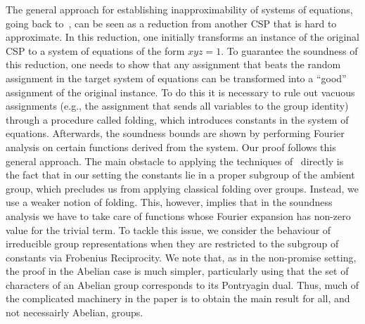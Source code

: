 \documentclass[a4paper,11pt]{article}
\theoremstyle{definition}
\begin{document}
The general approach for establishing inapproximability of systems of equations,
going back to~\cite{Hastad01:jacm,EHR04:tcs}, can be seen as a reduction from another CSP that is hard to approximate. In this reduction, one initially
transforms an instance of the original CSP to a system of equations of the
form $xyz=1$. To guarantee the soundness of this reduction, one needs to show that any
assignment that beats the random assignment in the target system of
equations can be transformed into a ``good'' assignment of the original
instance. To do this it is necessary to rule out vacuous assignments (e.g., the
assignment that sends all variables to the group identity) through a procedure
called folding, which introduces 
constants in the system of equations.
Afterwards, the soundness bounds are shown by performing Fourier analysis on
certain functions derived from the system.
Our proof follows this general approach. The main obstacle to
applying the techniques of~\cite{EHR04:tcs} directly is the fact that in our setting 
the constants lie in a proper subgroup of the
ambient group, which precludes us from applying classical folding over groups. Instead, we use a weaker notion of folding. This, however, implies that in the soundness analysis we have to take care of functions whose Fourier
expansion has non-zero value for the trivial term. To tackle this
issue, we consider the behaviour of irreducible group representations when they are
restricted to the subgroup of constants
via Frobenius Reciprocity.
We note that, as in the non-promise setting, the proof in the Abelian case is
much simpler, particularly using that the set of characters of an Abelian group
corresponds to its Pontryagin dual. Thus, much of the complicated machinery in
the paper is to obtain the main result for all, and not necessairly Abelian, groups.
\end{document}
